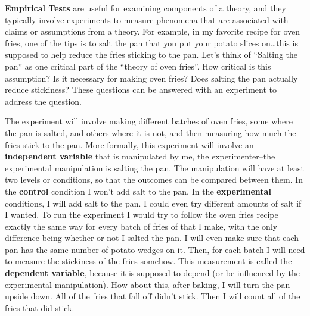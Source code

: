 \documentclass[
  oneside,
  12pt]{crumpbook}
\begin{document}
\textbf{Empirical Tests} are useful for examining components of a theory, and they typically involve experiments to measure phenomena that are associated with claims or assumptions from a theory. For example, in my favorite recipe for oven fries, one of the tips is to salt the pan that you put your potato slices on\ldots this is supposed to help reduce the fries sticking to the pan. Let's think of ``Salting the pan'' as one critical part of the ``theory of oven fries''. How critical is this assumption? Is it necessary for making oven fries? Does salting the pan actually reduce stickiness? These questions can be answered with an experiment to address the question.

The experiment will involve making different batches of oven fries, some where the pan is salted, and others where it is not, and then measuring how much the fries stick to the pan. More formally, this experiment will involve an \textbf{independent variable} that is manipulated by me, the experimenter--the experimental manipulation is salting the pan. The manipulation will have at least two levels or conditions, so that the outcomes can be compared between them. In the \textbf{control} condition I won't add salt to the pan. In the \textbf{experimental} conditions, I will add salt to the pan. I could even try different amounts of salt if I wanted. To run the experiment I would try to follow the oven fries recipe exactly the same way for every batch of fries of that I make, with the only difference being whether or not I salted the pan. I will even make sure that each pan has the same number of potato wedges on it. Then, for each batch I will need to measure the stickiness of the fries somehow. This measurement is called the \textbf{dependent variable}, because it is supposed to depend (or be influenced by the experimental manipulation). How about this, after baking, I will turn the pan upside down. All of the fries that fall off didn't stick. Then I will count all of the fries that did stick.
\end{document}
